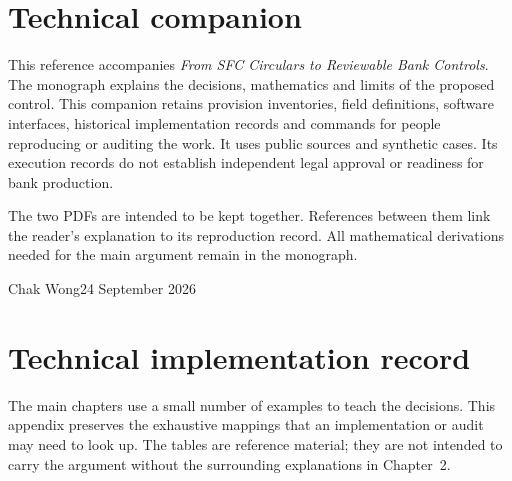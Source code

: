 \documentclass[12pt,a4paper,oneside,openany]{book}
\renewcommand{\chaptermark}[1]{\markboth{Chapter \thechapter}{}}
\begin{document}
\raggedbottom
\frontmatter
\chapter*{Technical companion}

This reference accompanies \emph{From SFC Circulars to Reviewable Bank Controls}.
The monograph explains the decisions, mathematics and limits of the proposed
control. This companion retains provision inventories, field definitions,
software interfaces, historical implementation records and commands for people
reproducing or auditing the work. It uses public sources and synthetic cases.
Its execution records do not establish independent legal approval or readiness
for bank production.

The two PDFs are intended to be kept together. References between them link the
reader's explanation to its reproduction record. All mathematical derivations
needed for the main argument remain in the monograph.

Chak Wong\hfill 24 September 2026

\tableofcontents
\mainmatter
\appendix
{}
\renewcommand{\chaptermark}[1]{\markboth{Appendix \thechapter}{}}
\chapter{Technical implementation record}
\label{app:implementation-record}

The main chapters use a small number of examples to teach the decisions. This
appendix preserves the exhaustive mappings that an implementation or audit may
need to look up. The tables are reference material; they are not intended to
carry the argument without the surrounding explanations in Chapter~2.
\end{document}
